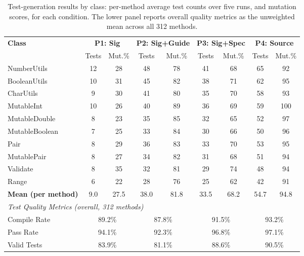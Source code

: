 \begin{table}[t]
\centering
\caption{Test-generation results by class: per-method average test counts over
five runs, and mutation scores, for each condition. The lower panel reports
overall quality metrics as the unweighted mean across all 312 methods.}
\label{tab:tg-results}
\small
\begin{tabular}{l|cc|cc|cc|cc}
\toprule
\multirow{2}{*}{\textbf{Class}} &
\multicolumn{2}{c|}{\textbf{P1: Sig}} &
\multicolumn{2}{c|}{\textbf{P2: Sig+Guide}} &
\multicolumn{2}{c|}{\textbf{P3: Sig+Spec}} &
\multicolumn{2}{c}{\textbf{P4: Source}} \\
\cline{2-9}
 & Tests & Mut.\% & Tests & Mut.\% & Tests & Mut.\% & Tests & Mut.\% \\
\midrule
NumberUtils    & 12 & 28 & 48 & 78 & 41 & 68 & 65 & 92 \\
BooleanUtils   & 10 & 31 & 45 & 82 & 38 & 71 & 62 & 95 \\
CharUtils      &  9 & 30 & 41 & 80 & 35 & 70 & 58 & 93 \\
MutableInt     & 10 & 26 & 40 & 89 & 36 & 69 & 59 & 100 \\
MutableDouble  &  8 & 23 & 35 & 85 & 32 & 65 & 52 & 97 \\
MutableBoolean &  7 & 25 & 33 & 84 & 30 & 66 & 50 & 96 \\
Pair           &  8 & 29 & 36 & 83 & 33 & 70 & 53 & 95 \\
MutablePair    &  8 & 27 & 34 & 82 & 31 & 68 & 51 & 94 \\
Validate       &  8 & 35 & 32 & 81 & 29 & 74 & 48 & 94 \\
Range          &  6 & 22 & 28 & 76 & 25 & 62 & 42 & 91 \\
\midrule
\textbf{Mean (per method)} & 9.0 & 27.5 & 38.0 & 81.8 & 33.5 & 68.2 & 54.7 & 94.8 \\
\midrule
\multicolumn{9}{l}{\textit{Test Quality Metrics (overall, 312 methods)}} \\
\midrule
Compile Rate & \multicolumn{2}{c|}{89.2\%} & \multicolumn{2}{c|}{87.8\%} & \multicolumn{2}{c|}{91.5\%} & \multicolumn{2}{c}{93.2\%} \\
Pass Rate & \multicolumn{2}{c|}{94.1\%} & \multicolumn{2}{c|}{92.3\%} & \multicolumn{2}{c|}{96.8\%} & \multicolumn{2}{c}{97.1\%} \\
Valid Tests & \multicolumn{2}{c|}{83.9\%} & \multicolumn{2}{c|}{81.1\%} & \multicolumn{2}{c|}{88.6\%} & \multicolumn{2}{c}{90.5\%} \\
\bottomrule
\end{tabular}
\end{table}

